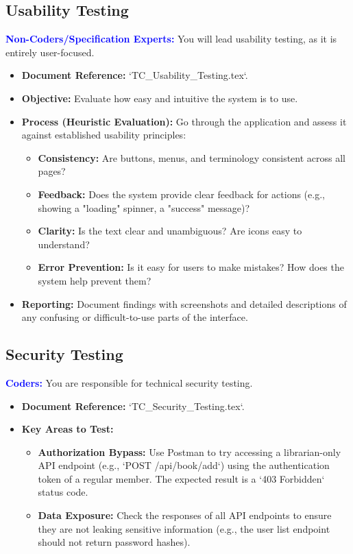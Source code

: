 \documentclass{article}
\newcommand{\role}[1]{\textbf{\textcolor{blue}{#1:}}}
\begin{document}
\subsection{Usability Testing}
\role{Non-Coders/Specification Experts}
You will lead usability testing, as it is entirely user-focused.
\begin{itemize}
    \item \textbf{Document Reference:} `TC\_Usability\_Testing.tex`.
    \item \textbf{Objective:} Evaluate how easy and intuitive the system is to use.
    \item \textbf{Process (Heuristic Evaluation):} Go through the application and assess it against established usability principles:
    \begin{itemize}
        \item \textbf{Consistency:} Are buttons, menus, and terminology consistent across all pages?
        \item \textbf{Feedback:} Does the system provide clear feedback for actions (e.g., showing a "loading" spinner, a "success" message)?
        \item \textbf{Clarity:} Is the text clear and unambiguous? Are icons easy to understand?
        \item \textbf{Error Prevention:} Is it easy for users to make mistakes? How does the system help prevent them?
    \end{itemize}
    \item \textbf{Reporting:} Document findings with screenshots and detailed descriptions of any confusing or difficult-to-use parts of the interface.
\end{itemize}

\subsection{Security Testing}
\role{Coders}
You are responsible for technical security testing.
\begin{itemize}
    \item \textbf{Document Reference:} `TC\_Security\_Testing.tex`.
    \item \textbf{Key Areas to Test:}
    \begin{itemize}
        \item \textbf{Authorization Bypass:} Use Postman to try accessing a librarian-only API endpoint (e.g., `POST /api/book/add`) using the authentication token of a regular member. The expected result is a `403 Forbidden` status code.
        \item \textbf{Data Exposure:} Check the responses of all API endpoints to ensure they are not leaking sensitive information (e.g., the user list endpoint should not return password hashes).
    \end{itemize}
\end{itemize}
\end{document}
